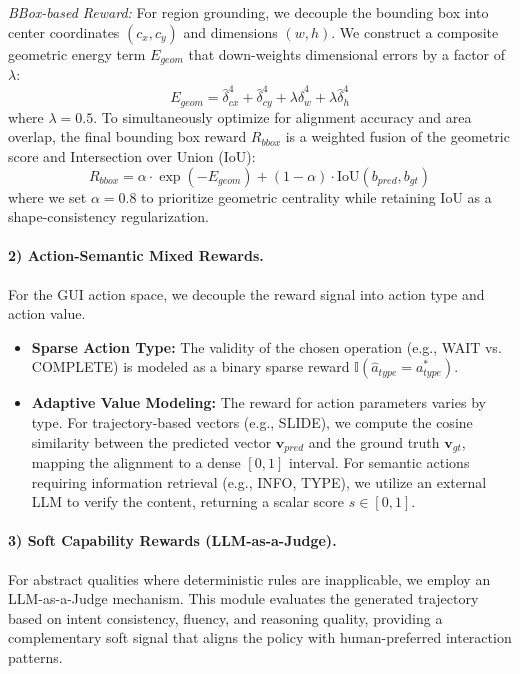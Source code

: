 \noindent\textit{BBox-based Reward:} For region grounding, we decouple the bounding box into center coordinates $(c_x, c_y)$ and dimensions $(w, h)$. We construct a composite geometric energy term $E_{geom}$ that down-weights dimensional errors by a factor of $\lambda$:
\begin{equation}
    E_{geom} = \hat{\delta}_{cx}^4 + \hat{\delta}_{cy}^4 + \lambda \hat{\delta}_w^4 + \lambda \hat{\delta}_h^4
\end{equation}
where $\lambda=0.5$. To simultaneously optimize for alignment accuracy and area overlap, the final bounding box reward $R_{bbox}$ is a weighted fusion of the geometric score and Intersection over Union (IoU):
\begin{equation}
    R_{bbox} = \alpha \cdot \exp(-E_{geom}) + (1 - \alpha) \cdot \text{IoU}(b_{pred}, b_{gt})
\end{equation}
where we set $\alpha = 0.8$ to prioritize geometric centrality while retaining IoU as a shape-consistency regularization.

\paragraph{2) Action-Semantic Mixed Rewards.}
For the GUI action space, we decouple the reward signal into action type and action value.
\begin{itemize}[leftmargin=*, itemsep=1pt]
    \item \textbf{Sparse Action Type:} The validity of the chosen operation (e.g., WAIT vs. COMPLETE) is modeled as a binary sparse reward $\mathbb{I}(\hat{a}_{type} = a^*_{type})$.
    \item \textbf{Adaptive Value Modeling:} The reward for action parameters varies by type. For trajectory-based vectors (e.g., SLIDE), we compute the cosine similarity between the predicted vector $\mathbf{v}_{pred}$ and the ground truth $\mathbf{v}_{gt}$, mapping the alignment to a dense $[0, 1]$ interval. For semantic actions requiring information retrieval (e.g., INFO, TYPE), we utilize an external LLM to verify the content, returning a scalar score $s \in [0, 1]$.
\end{itemize}

\paragraph{3) Soft Capability Rewards (LLM-as-a-Judge).}
For abstract qualities where deterministic rules are inapplicable, we employ an LLM-as-a-Judge mechanism. 
This module evaluates the generated trajectory based on intent consistency, fluency, and reasoning quality, providing a complementary soft signal that aligns the policy with human-preferred interaction patterns.


